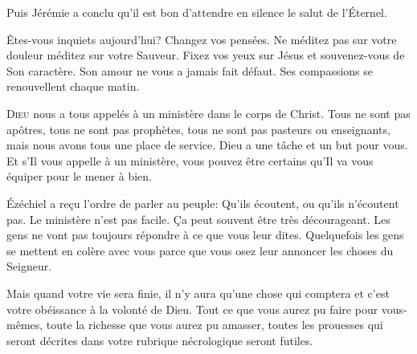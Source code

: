 Puis Jérémie a conclu qu'il est bon \Og d'attendre en silence
 le salut de l'Éternel. \Fg{}

Êtes-vous inquiets aujourd'hui? Changez vos pensées.
 Ne méditez pas sur votre douleur \ocadr méditez sur votre Sauveur.
 Fixez vos yeux sur Jésus et souvenez-vous de Son caractère.
 Son amour ne vous a jamais fait défaut.
 Ses compassions se renouvellent chaque matin. 

\dvrule








\lettrine{D}{ieu} nous a tous appelés à un ministère
 dans le corps de Christ. Tous ne sont pas apôtres,
 tous ne sont pas prophètes, tous ne sont pas pasteurs ou enseignants,
 mais nous avons tous une place de service.
 Dieu a une tâche et un but pour vous.
 Et s'Il vous appelle à un ministère, vous pouvez être certains
 qu'Il va vous équiper pour le mener à bien. 


Ézéchiel a re\c{c}u l'ordre de parler au peuple: 
 \Og Qu'ils écoutent, ou qu'ils n'écoutent pas. \Fg{}
 Le ministère n'est pas facile. Ça peut souvent être très décourageant.
 Les gens ne vont pas toujours répondre à ce que vous leur dites.
 Quelquefois les gens se mettent en colère avec vous parce que vous osez
 leur annoncer les choses du Seigneur. 

Mais quand votre vie sera finie, il n'y aura qu'une chose qui comptera 
 \ocadr et c'est votre obéissance à la volonté de Dieu.
 Tout ce que vous aurez pu faire pour vous-mêmes, toute la richesse
 que vous aurez pu amasser, toutes les prouesses qui seront décrites
 dans votre rubrique nécrologique seront futiles. 


